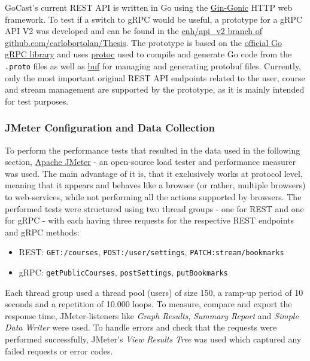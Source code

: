 GoCast's current REST API is written in Go using the \href{https://github.com/gin-gonic/gin}{Gin-Gonic} HTTP web framework. To test if a switch to gRPC would be useful, a prototype for a gRPC \ac{API} V2 was developed and can be found in the \href{https://github.com/carlobortolan/Thesis/tree/enh/api\_v2}{enh/api\_v2 branch of github.com/carlobortolan/Thesis}.
The prototype is based on the \href{https://google.golang.org/grpc}{official Go gRPC library} and uses \href{https://github.com/protocolbuffers/protobuf}{protoc} used to compile and generate Go code from the \texttt{.proto} files as well as \href{https://github.com/bufbuild/buf}{buf} for managing and generating protobuf files. Currently, only the most important original REST \ac{API} endpoints related to the user, course and stream management are supported by the prototype, as it is mainly intended for test purposes.

\subsubsection{JMeter Configuration and Data Collection}

To perform the performance tests that resulted in the data used in the following section, \href{https://jmeter.apache.org/}{Apache JMeter} - an open-source load tester and performance measurer was used. The main advantage of it is, that it exclusively works at protocol level, meaning that it appears and behaves like a browser (or rather, multiple browsers) to web-services, while not performing all the actions supported by browsers. The performed tests were structured using two thread groups - one for REST and one for gRPC - with each having three requests for the respective REST endpoints and gRPC methods:
\begin{itemize}
    \item REST: \texttt{GET:/courses}, \texttt{POST:/user/settings}, \texttt{PATCH:stream/bookmarks}
    \item gRPC: \texttt{getPublicCourses}, \texttt{postSettings}, \texttt{putBookmarks}
\end{itemize}
Each thread group used a thread pool (users) of size 150, a ramp-up period of 10 seconds and a repetition of 10.000 loops.
To measure, compare and export the response time, JMeter-listeners like \textit{Graph Results}, \textit{Summary Report} and \textit{Simple Data Writer} were used. To handle errors and check that the requests were performed successfully, JMeter’s \textit{View Results Tree} was used which captured any failed requests or error codes.

